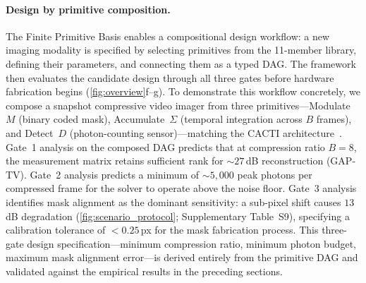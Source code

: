 \paragraph{Design by primitive composition.}
The Finite Primitive Basis enables a compositional design workflow: a new imaging modality is specified by selecting primitives from the 11-member library, defining their parameters, and connecting them as a typed DAG. The framework then evaluates the candidate design through all three gates before hardware fabrication begins (\cref{fig:overview}f--g). To demonstrate this workflow concretely, we compose a snapshot compressive video imager from three primitives---Modulate~$M$ (binary coded mask), Accumulate~$\Sigma$ (temporal integration across $B$ frames), and Detect~$D$ (photon-counting sensor)---matching the CACTI architecture~\cite{yuan2021sci}. Gate~1 analysis on the composed DAG predicts that at compression ratio $B = 8$, the measurement matrix retains sufficient rank for ${\sim}27$\,dB reconstruction (GAP-TV). Gate~2 analysis predicts a minimum of ${\sim}5{,}000$ peak photons per compressed frame for the solver to operate above the noise floor. Gate~3 analysis identifies mask alignment as the dominant sensitivity: a sub-pixel shift causes $13$\,dB degradation (\cref{fig:scenario_protocol}; Supplementary Table~S9), specifying a calibration tolerance of $< 0.25$\,px for the mask fabrication process. This three-gate design specification---minimum compression ratio, minimum photon budget, maximum mask alignment error---is derived entirely from the primitive DAG and validated against the empirical results in the preceding sections.

